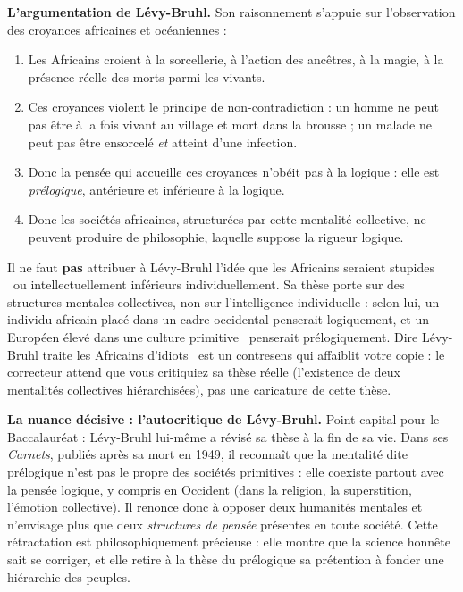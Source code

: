 \documentclass[11pt]{article}
\newcommand{\cle}[1]{{\popxbold\color{popdark}#1}}
\begin{document}
\textbf{L'argumentation de Lévy-Bruhl.} Son raisonnement s'appuie sur l'observation des croyances africaines et océaniennes :

\begin{enumerate}
\item Les Africains croient à la sorcellerie, à l'action des ancêtres, à la magie, à la présence réelle des morts parmi les vivants.
\item Ces croyances violent le principe de non-contradiction : un homme ne peut pas être à la fois vivant au village et mort dans la brousse ; un malade ne peut pas être ensorcelé \emph{et} atteint d'une infection.
\item Donc la pensée qui accueille ces croyances n'obéit pas à la logique : elle est \emph{prélogique}, antérieure et inférieure à la logique.
\item Donc les sociétés africaines, structurées par cette mentalité collective, ne peuvent produire de philosophie, laquelle suppose la rigueur logique.
\end{enumerate}

\begin{attention}
Il ne faut \textbf{pas} attribuer à Lévy-Bruhl l'idée que les Africains seraient \guillemotleft stupides \guillemotright\ ou intellectuellement inférieurs individuellement. Sa thèse porte sur des \cle{structures mentales collectives}, non sur l'intelligence individuelle : selon lui, un individu africain placé dans un cadre occidental penserait logiquement, et un Européen élevé dans une culture \guillemotleft primitive \guillemotright\ penserait prélogiquement. Dire \guillemotleft Lévy-Bruhl traite les Africains d'idiots \guillemotright\ est un contresens qui affaiblit votre copie : le correcteur attend que vous critiquiez sa thèse réelle (l'existence de deux mentalités collectives hiérarchisées), pas une caricature de cette thèse.
\end{attention}

\textbf{La nuance décisive : l'autocritique de Lévy-Bruhl.} Point capital pour le Baccalauréat : Lévy-Bruhl lui-même a révisé sa thèse à la fin de sa vie. Dans ses \emph{Carnets}, publiés après sa mort en 1949, il reconnaît que la mentalité dite prélogique n'est pas le propre des sociétés \guillemotleft primitives \guillemotright : elle coexiste partout avec la pensée logique, y compris en Occident (dans la religion, la superstition, l'émotion collective). Il renonce donc à opposer deux humanités mentales et n'envisage plus que deux \emph{structures de pensée} présentes en toute société. Cette rétractation est philosophiquement précieuse : elle montre que la science honnête sait se corriger, et elle retire à la thèse du prélogique sa prétention à fonder une hiérarchie des peuples.
\end{document}
